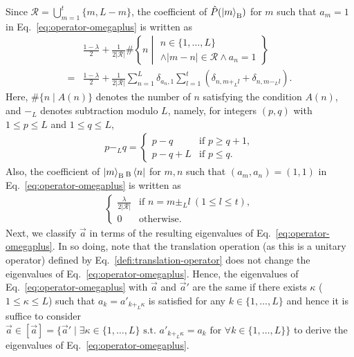 \documentclass[twocolumn,superscriptaddress,pra,footinbib,notitlepage]{revtex4-1}
\newcommand{\1}{\mbox{1}\hspace{-0.25em}\mbox{l}}
\newcommand{\abs}[1]{\lvert#1\rvert}
\newcommand{\relmiddle}[1]{\mathrel{}\middle#1\mathrel{}}
\begin{document}
Since $\mathcal{R}=\bigcup_{m=1}^t\{m, L-m\}$, the coefficient of $\hat{P}(\ket{m}_\textrm{B})$ for $m$ such that $a_m=1$ in Eq.~\eqref{eq:operator-omegaplus} is written as
\begin{align}
&\frac{1-\lambda}{2}+\frac{1}{2\abs{\mathcal{R}}}\#\left\{n\relmiddle|
\begin{array}{l}
n\in\{1, \dots, L\}\\
\wedge\abs{m-n}\in\mathcal{R}\wedge a_n=1
\end{array}
\right\}
\nonumber\\
=&\frac{1-\lambda}{2}+\frac{1}{2\abs{\mathcal{R}}}\sum_{n=1}^L\delta_{a_n, 1}\sum_{l=1}^t\left(\delta_{n, m+_Ll}+\delta_{n, m-_Ll}\right).
\end{align}
Here, $\#\{n\mid A(n)\}$ denotes the number of $n$ satisfying the condition $A(n)$, and $-_L$ denotes subtraction modulo $L$, namely, for integers $(p, q)$ with $1\leq p\leq L$ and $1\leq q \leq L$,
\begin{align}
p-_Lq=
\begin{cases}
p-q&\textrm{if }p\geq q+1,\\
p-q+L&\textrm{if }p\leq q.
\end{cases}
\end{align}
Also, the coefficient of $\ket{m}_\textrm{B}{}_\textrm{B}\bra{n}$ for $m, n$ such that $(a_m, a_n)=(1, 1)$ in Eq.~\eqref{eq:operator-omegaplus} is written as
\begin{align}
\begin{cases}
\frac{\lambda}{2\abs{\mathcal{R}}}&\textrm{if }n=m\pm_L l~(1\leq l\leq t),\\
0&\textrm{otherwise}.
\end{cases}
\end{align}
Next, we classify $\vec{a}$ in terms of the resulting eigenvalues of Eq.~\eqref{eq:operator-omegaplus}.
In so doing, note that the translation operation (as this is a unitary operator) defined by Eq.~\eqref{defi:translation-operator} does not change the eigenvalues of Eq.~\eqref{eq:operator-omegaplus}.
Hence, the eigenvalues of Eq.~\eqref{eq:operator-omegaplus} with $\vec{a}$ and $\vec{a}'$ are the same if there exists $\kappa$ ($1\leq \kappa\leq L$) such that $a_k=a'_{k+_L\kappa}$ is satisfied for any $k\in\{1,\dots, L\}$ and hence it is suffice to consider $\vec{a}\in[\vec{a}]=\{\vec{a}'\mid\exists\kappa\in\{1,\dots, L\}\textrm{ s.t. }a'_{k+_L\kappa}=a_k\textrm{ for }\forall k\in\{1,\dots, L\}\}$ to derive the eigenvalues of Eq.~\eqref{eq:operator-omegaplus}.
\end{document}
